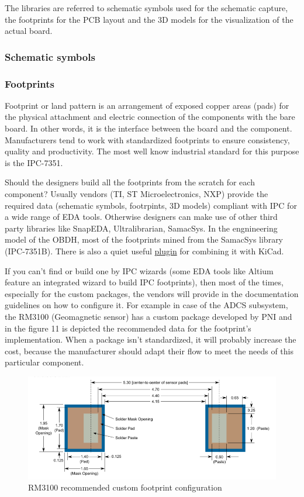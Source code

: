 \documentclass[final]{cubedoc}
\begin{document}
	The libraries are referred to schematic symbols used for the schematic capture, the footprints for the PCB layout and the 3D models for the visualization of the actual board.
	
	\subsubsection{Schematic symbols}
	
	\subsubsection{Footprints}
	
	Footprint or land pattern is an arrangement of exposed copper areas (pads) for the physical attachment and electric connection of the components with the bare board. In other words, it is the interface between the board and the component. Manufacturers tend to work with standardized footprints to ensure consistency, quality and productivity. The most well know industrial standard for this purpose is the IPC-7351. 
	
	Should the designers build all the footprints from the scratch for each component? Usually vendors (TI, ST Microelectronics, NXP) provide the required data (schematic symbols, footrpints, 3D models) compliant with IPC for a wide range of EDA tools. Otherwise designers can make use of other third party libraries like SnapEDA, Ultralibrarian, SamacSys. In the engnineering model of the OBDH, most of the footprints mined from the SamacSys library (IPC-7351B). There is also a quiet useful \href{https://www.samacsys.com/kicad-libraries/}{plugin} for combining it with KiCad.
	
	If you can't find or build one by IPC wizards (some EDA tools like Altium feature an integrated wizard to build IPC footprints), then most of the times, especially for the custom packages, the vendors will provide in the documentation guidelines on how to configure it. For example in case of the ADCS subsystem, the RM3100 (Geomagnetic sensor) has a custom package developed by PNI and in the figure 11 is depicted the recommended data for the footprint's implementation. When a package isn't standardized, it will probably increase the cost, because the manufacturer should adapt their flow to meet the needs of this particular component. 
	
	\begin{figure}[h!]
		\centering
		\includegraphics[keepaspectratio, width = \textwidth]{assets/rm3100_foot.png}
		\caption{RM3100 recommended custom footprint configuration \cite[p.9]{rm3100}}
	\end{figure}
	
\end{document}
